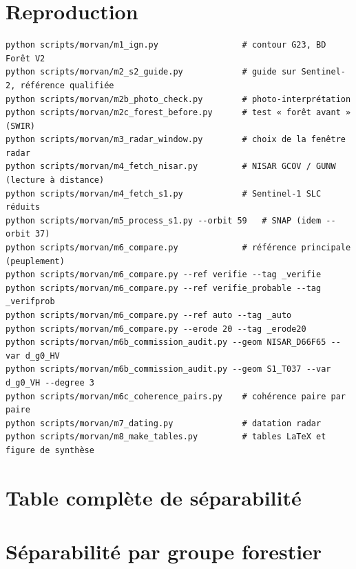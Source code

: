 \documentclass[11pt,a4paper]{article}
\begin{document}


\printbibliography[heading=bibintoc,title={Références}]

\appendix
\section{Reproduction}
\begin{verbatim}
python scripts/morvan/m1_ign.py                 # contour G23, BD Forêt V2
python scripts/morvan/m2_s2_guide.py            # guide sur Sentinel-2, référence qualifiée
python scripts/morvan/m2b_photo_check.py        # photo-interprétation
python scripts/morvan/m2c_forest_before.py      # test « forêt avant » (SWIR)
python scripts/morvan/m3_radar_window.py        # choix de la fenêtre radar
python scripts/morvan/m4_fetch_nisar.py         # NISAR GCOV / GUNW (lecture à distance)
python scripts/morvan/m4_fetch_s1.py            # Sentinel-1 SLC réduits
python scripts/morvan/m5_process_s1.py --orbit 59   # SNAP (idem --orbit 37)
python scripts/morvan/m6_compare.py             # référence principale (peuplement)
python scripts/morvan/m6_compare.py --ref verifie --tag _verifie
python scripts/morvan/m6_compare.py --ref verifie_probable --tag _verifprob
python scripts/morvan/m6_compare.py --ref auto --tag _auto
python scripts/morvan/m6_compare.py --erode 20 --tag _erode20
python scripts/morvan/m6b_commission_audit.py --geom NISAR_D66F65 --var d_g0_HV
python scripts/morvan/m6b_commission_audit.py --geom S1_T037 --var d_g0_VH --degree 3
python scripts/morvan/m6c_coherence_pairs.py    # cohérence paire par paire
python scripts/morvan/m7_dating.py              # datation radar
python scripts/morvan/m8_make_tables.py         # tables LaTeX et figure de synthèse
\end{verbatim}

\section{Table complète de séparabilité}
\begin{table}[H]
\centering\scriptsize
\caption{Toutes les variables, référence principale (moyennes coupe / forêt, d de Cohen, AUC et IC 95~\%, distance de
Jeffries-Matusita).}

\end{table}

\section{Séparabilité par groupe forestier}
\begin{table}[H]
\centering\small
\caption{AUC de $\Delta\gamma^0$ croisée par groupe forestier, référence automatique (60 objets). Les valeurs proches de
0,5 en feuillus traduisent surtout les erreurs de la référence (sénescence).}

\end{table}
\end{document}
